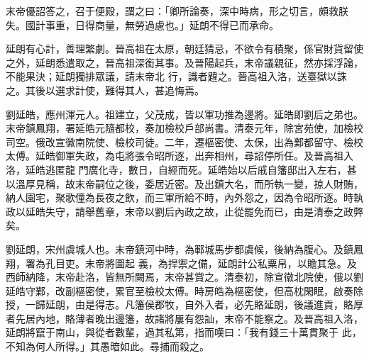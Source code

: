 \begin{pinyinscope}
 末帝優詔答之，召于便殿，謂之曰：「卿所論奏，深中時病，形之切言，頗救朕失。國計事重，日得商量，無勞過慮也。」延朗不得已而承命。



 延朗有心計，善理繁劇。晉高祖在太原，朝廷猜忌，不欲令有積聚，係官財貨留使之外，延朗悉遣取之，晉高祖深銜其事。及晉陽起兵，末帝議親征，然亦採浮論，不能果決；延朗獨排眾議，請末帝北
 行，識者韙之。晉高祖入洛，送臺獄以誅之。其後以選求計使，難得其人，甚追悔焉。



 劉延皓，應州渾元人。祖建立，父茂成，皆以軍功推為邊將。延皓即劉后之弟也。末帝鎮鳳翔，署延皓元隨都校，奏加檢校戶部尚書。清泰元年，除宮苑使，加檢校司空。俄改宣徽南院使、檢校司徒。二年，遷樞密使、太保，出為鄴都留守、檢校太傅。延皓御軍失政，為屯將張令昭所逐，出奔相州，尋詔停所任。及晉高祖入洛，延皓逃匿龍
 門廣化寺，數日，自經而死。延皓始以后戚自籓邸出入左右，甚以溫厚見稱，故末帝嗣位之後，委居近密。及出鎮大名，而所執一變，掠人財賄，納人園宅，聚歌僮為長夜之飲，而三軍所給不時，內外怨之，因為令昭所逐。時執政以延皓失守，請舉舊章，末帝以劉后內政之故，止從罷免而已，由是清泰之政弊矣。



 劉延朗，宋州虞城人也。末帝鎮河中時，為鄆城馬步都虞候，後納為腹心。及鎮鳳翔，署為孔目吏。末帝將圖起
 義，為捍禦之備，延朗計公私粟帛，以贍其急。及西師納降，末帝赴洛，皆無所闕焉，末帝甚賞之。清泰初，除宣徽北院使，俄以劉延皓守鄴，改副樞密使，累官至檢校太傅。時房皓為樞密使，但高枕閑眠，啟奏除授，一歸延朗，由是得志。凡籓侯郡牧，自外入者，必先賂延朗，後議進貢，賂厚者先居內地，賂薄者晚出邊籓，故諸將屢有怨訕，末帝不能察之。及晉高祖入洛，延朗將竄于南山，與從者數輩，過其私第，指而嘆曰：「我有錢三十萬貫聚于
 此，不知為何人所得。」其愚暗如此。尋捕而殺之。



\end{pinyinscope}